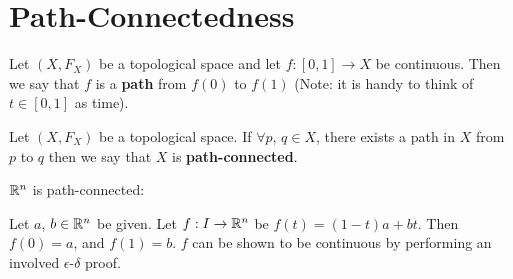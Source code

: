 \section{Path-Connectedness} 
\begin{definition}
Let $(X, F_X)$ be a topological space and let $f:[0,1] \rightarrow X$ be continuous. Then we say that $f$ is a \textbf{path} from $f(0)$ to $f(1)$ (Note: it is handy to think of $t \in [0,1]$ as time). 
\end{definition}
\begin{definition}
Let $(X, F_X)$ be a topological space. If $\forall p$, $q \in X$, there exists a path in $X$ from $p$ to $q$ then we say that $X$ is \textbf{path-connected}. 
\end{definition}
\begin{example}
$\mathbb R^n$ is path-connected:

Let $a$, $b \in \mathbb R^n$ be given. Let $f: I \rightarrow \mathbb R^n$ be $f(t) = (1-t)a + bt$. Then $f(0) = a$, and $f(1) = b$. $f$ can be shown to be continuous by performing an involved $\epsilon$-$\delta$ proof. 
\end{example}

